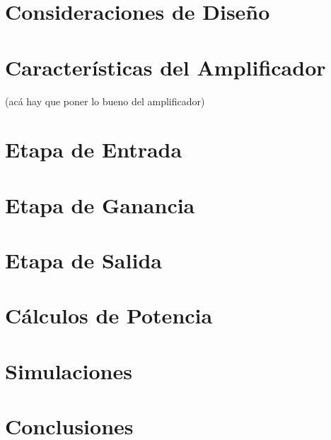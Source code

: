 







\tableofcontents
\newpage


\section{Consideraciones de Diseño}
	\label{consideraciones}
%		

\section{Características del Amplificador}
	\label{caracteristicas}
	(acá hay que poner lo bueno del amplificador)
%	

\section{Etapa de Entrada}
	\label{inputstage}
%	
		
\section{Etapa de Ganancia}
	\label{gainstage}
%	
	
\section{Etapa de Salida}
	\label{outputstage}
%	

\section{Cálculos de Potencia}
	\label{calculospotencia}
%		
	
\section{Simulaciones}
	\label{simulaciones}
%	

\section{Conclusiones}
	\label{simulaciones}
	
